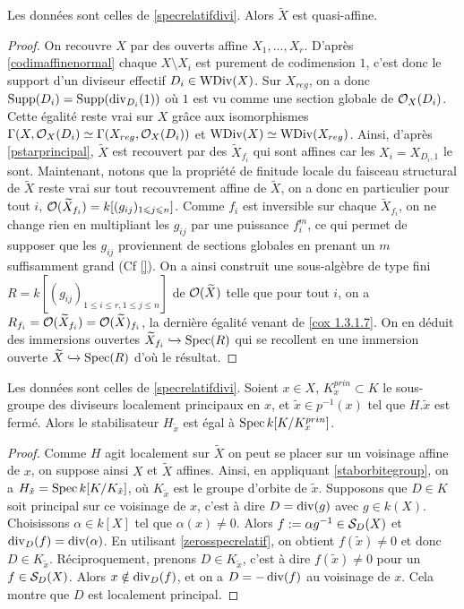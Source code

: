 \begin{cor}\label{specrelatifQuasiAff}
Les données sont celles de \ref{specrelatifdivi}. Alors $\widetilde{X}$ est quasi-affine.
\end{cor}
\begin{proof}
On recouvre $X$ par des ouverts affine $X_1,...,X_r$. D'après \ref{codimaffinenormal} chaque $X\setminus X_i$ est purement de codimension $1$, c'est donc le support d'un diviseur effectif $D_i\in \operatorname{WDiv}(X)$. Sur $X_{reg}$, on a donc $\operatorname{Supp}(D_i)=\operatorname{Supp}(\operatorname{div}_{D_i}(1))$ où $1$ est vu comme une section globale de $\mathcal{O}_X(D_i)$. Cette égalité reste vrai sur $X$ grâce aux isomorphismes $\Gamma(X ,\mathcal{O}_X(D_i)\simeq\Gamma(X_{reg} ,\mathcal{O}_X(D_i))$ et $\operatorname{WDiv}(X)\simeq\operatorname{WDiv}(X_{reg})$. Ainsi, d'après \ref{pstarprincipal}, $\widetilde{X}$ est recouvert par des $\widetilde{X}_{f_i}$ qui sont affines car les $X_i=X_{D_i,1}$ le sont. Maintenant, notons que la propriété de finitude locale du faisceau structural de $\widetilde{X}$ reste vrai sur tout recouvrement affine de $\widetilde{X}$, on a donc en particulier pour tout $i$, $\mathcal{O}(\widetilde{X}_{f_i})=k[(g_{ij})_{1\leqslant j\leqslant n}]$. Comme $f_i$ est inversible sur chaque $\widetilde{X}_{f_i}$, on ne change rien en multipliant les $g_{ij}$ par une puissance $f_i^m$, ce qui permet de supposer que les $g_{ij}$ proviennent de sections globales en prenant un $m$ suffisamment grand (Cf \ref{}). On a ainsi construit une sous-algèbre de type fini $R=k[(g_{ij})_{1\leq i\leq r, 1\leq j\leq n}]$ de $\mathcal{O}(\widetilde{X})$ telle que pour tout $i$, on a $R_{f_i}=\mathcal{O}({\widetilde{X}_{f_i}})=\mathcal{O}({\widetilde{X}})_{f_i}$, la dernière égalité venant de \ref{cox 1.3.1.7}. On en déduit des immersions ouvertes $\widetilde{X}_{f_i}\xhookrightarrow{} \operatorname{Spec}(R)$ qui se recollent en une immersion ouverte $\widetilde{X}\xhookrightarrow{} \operatorname{Spec}(R)$ d'où le résultat.
\end{proof}

\begin{cor}
Les données sont celles de \ref{specrelatifdivi}. Soient $x\in X$, $K_x^{prin}\subset K$ le sous-groupe des diviseurs localement principaux en $x$, et $\tilde{x}\in p^{-1}(x)$ tel que $H.\tilde{x}$ est fermé. Alors le stabilisateur $H_{\tilde{x}}$ est égal à $\operatorname{Spec} k[K/K_x^{prin}]$.
\end{cor}
\begin{proof}
Comme $H$ agit localement sur $\widetilde{X}$ on peut se placer sur un voisinage affine de $x$, on suppose ainsi $X$ et $\widetilde{X}$ affines. Ainsi, en appliquant \ref{staborbitegroup}, on a $H_{\tilde{x}}=\operatorname{Spec} k[K/K_{\tilde{x}}]$, où $K_{\tilde{x}}$ est le groupe d'orbite de $\tilde{x}$. Supposons que $D\in K$ soit principal sur ce voisinage de $x$, c'est à dire $D=\operatorname{div}(g)$ avec $g\in k(X)$. Choisissons $\alpha \in k[X]$ tel que $\alpha(x)\neq 0$. Alors $f:=\alpha g^{-1}\in \mathcal{S}_D(X)$ et $\operatorname{div}_D(f)=\operatorname{div}(\alpha)$. En utilisant \ref{zerosspecrelatif}, on obtient $f(\tilde{x})\neq 0$ et donc $D\in K_{\tilde{x}}$. Réciproquement, prenons $D\in K_{\tilde{x}}$, c'est à dire $f(\tilde{x})\neq 0$ pour un $f\in \mathcal{S}_D(X)$. Alors $x\notin \operatorname{div}_D(f)$, et on a $D=-\operatorname{div}(f)$ au voisinage de $x$. Cela montre que $D$ est localement principal.
\end{proof}




